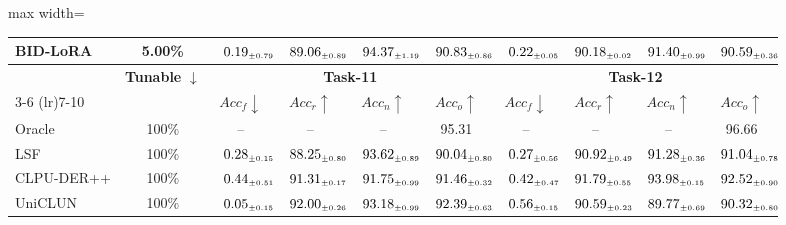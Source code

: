 \begin{table}[!htbp]
\begin{adjustbox}{max width=\textwidth}
\begin{tabular}{l|c|cccc|cccc}
\midrule
\rowcolor{pink!15}
\textbf{BID-LoRA} & 5.00\% & $\kern6pt0.19_{\scriptscriptstyle \pm 0.79}\kern-6pt$ & $\kern6pt89.06_{\scriptscriptstyle \pm 0.89}\kern-6pt$ & \colorbox{green!25}{$\kern6pt94.37_{\scriptscriptstyle \pm 1.19}\kern-6pt$} & \colorbox{yellow!35}{$\kern6pt90.83_{\scriptscriptstyle \pm 0.86}\kern-6pt$} & $\kern6pt0.22_{\scriptscriptstyle \pm 0.05}\kern-6pt$ & $\kern6pt90.18_{\scriptscriptstyle \pm 0.02}\kern-6pt$ & $\kern6pt91.40_{\scriptscriptstyle \pm 0.99}\kern-6pt$ & $\kern6pt90.59_{\scriptscriptstyle \pm 0.36}\kern-6pt$ \\
\midrule
\addlinespace[0.05cm]
\midrule
\multirow{2}{*}{\textbf{Method}} & \multirow{2}{*}{\textbf{Tunable} $\downarrow$}
& \multicolumn{4}{c|}{\textbf{Task-11}} & \multicolumn{4}{c}{\textbf{Task-12}} \\
\cmidrule(lr){3-6} \cmidrule(lr){7-10}
& & $Acc_f \downarrow$ & $Acc_r \uparrow$ & $Acc_n \uparrow$ & $Acc_o \uparrow$
& $Acc_f \downarrow$ & $Acc_r \uparrow$ & $Acc_n \uparrow$ & $Acc_o \uparrow$ \\
\midrule
Oracle        & 100\% & -- & -- & -- & 95.31 & -- & -- & -- & 96.66 \\
\midrule
LSF & 100\% & $\kern6pt0.28_{\scriptscriptstyle \pm 0.15}\kern-6pt$ & $\kern6pt88.25_{\scriptscriptstyle \pm 0.80}\kern-6pt$ & \colorbox{green!25}{$\kern6pt93.62_{\scriptscriptstyle \pm 0.89}\kern-6pt$} & $\kern6pt90.04_{\scriptscriptstyle \pm 0.80}\kern-6pt$ & $\kern6pt0.27_{\scriptscriptstyle \pm 0.56}\kern-6pt$ & $\kern6pt90.92_{\scriptscriptstyle \pm 0.49}\kern-6pt$ & $\kern6pt91.28_{\scriptscriptstyle \pm 0.36}\kern-6pt$ & $\kern6pt91.04_{\scriptscriptstyle \pm 0.78}\kern-6pt$ \\
CLPU-DER++ & 100\% & $\kern6pt0.44_{\scriptscriptstyle \pm 0.51}\kern-6pt$ & $\kern6pt91.31_{\scriptscriptstyle \pm 0.17}\kern-6pt$ & $\kern6pt91.75_{\scriptscriptstyle \pm 0.99}\kern-6pt$ & $\kern6pt91.46_{\scriptscriptstyle \pm 0.32}\kern-6pt$ & $\kern6pt0.42_{\scriptscriptstyle \pm 0.47}\kern-6pt$ & \colorbox{yellow!35}{$\kern6pt91.79_{\scriptscriptstyle \pm 0.55}\kern-6pt$} & \colorbox{green!25}{$\kern6pt93.98_{\scriptscriptstyle \pm 0.15}\kern-6pt$} & \colorbox{green!25}{$\kern6pt92.52_{\scriptscriptstyle \pm 0.90}\kern-6pt$} \\
UniCLUN & 100\% & $\kern6pt0.05_{\scriptscriptstyle \pm 0.15}\kern-6pt$ & \colorbox{green!25}{$\kern6pt92.00_{\scriptscriptstyle \pm 0.26}\kern-6pt$} & $\kern6pt93.18_{\scriptscriptstyle \pm 0.99}\kern-6pt$ & \colorbox{green!25}{$\kern6pt92.39_{\scriptscriptstyle \pm 0.63}\kern-6pt$} & $\kern6pt0.56_{\scriptscriptstyle \pm 0.15}\kern-6pt$ & $\kern6pt90.59_{\scriptscriptstyle \pm 0.23}\kern-6pt$ & $\kern6pt89.77_{\scriptscriptstyle \pm 0.69}\kern-6pt$ & $\kern6pt90.32_{\scriptscriptstyle \pm 0.80}\kern-6pt$ \\

\end{tabular}
\end{adjustbox}
\end{table}
